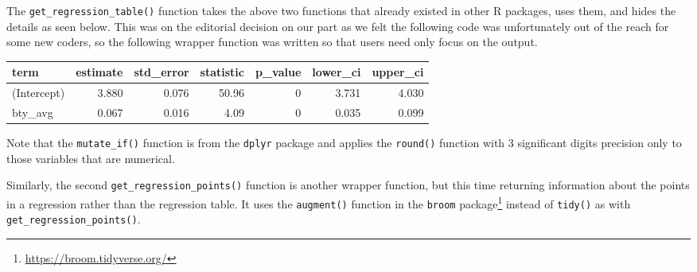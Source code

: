 \documentclass[12pt,]{krantz}
\makeatletter
\newenvironment{Shaded}{\begin{snugshade}}{\end{snugshade}}
\newcommand{\KeywordTok}[1]{\textcolor[rgb]{0.27,0.27,0.27}{\textbf{#1}}}
\newcommand{\DataTypeTok}[1]{\textcolor[rgb]{0.27,0.27,0.27}{#1}}
\newcommand{\DecValTok}[1]{\textcolor[rgb]{0.06,0.06,0.06}{#1}}
\newcommand{\StringTok}[1]{\textcolor[rgb]{0.5,0.5,0.5}{#1}}
\newcommand{\OtherTok}[1]{\textcolor[rgb]{0.37,0.37,0.37}{#1}}
\newcommand{\OperatorTok}[1]{\textcolor[rgb]{0.43,0.43,0.43}{\textbf{#1}}}
\newcommand{\NormalTok}[1]{#1}
\renewcommand{\href}[2]{#2\footnote{\url{#1}}}
\newenvironment{kframe}{%
\medskip{}
\setlength{\fboxsep}{.8em}
 \def\at@end@of@kframe{}%
 \ifinner\ifhmode%
  \def\at@end@of@kframe{\end{minipage}}%
  \begin{minipage}{\columnwidth}%
 \fi\fi%
 \def\FrameCommand##1{\hskip\@totalleftmargin \hskip-\fboxsep
 \colorbox{shadecolor}{##1}\hskip-\fboxsep
     \hskip-\linewidth \hskip-\@totalleftmargin \hskip\columnwidth}%
 \MakeFramed {\advance\hsize-\width
   \@totalleftmargin\z@ \linewidth\hsize
   \@setminipage}}%
 {\par\unskip\endMakeFramed%
 \at@end@of@kframe}
\renewenvironment{Shaded}{\begin{kframe}}{\end{kframe}}
\theoremstyle{definition}
\theoremstyle{definition}
\theoremstyle{definition}
\theoremstyle{remark}
\makeatother
\begin{document}
The \texttt{get\_regression\_table()} function takes the above two
functions that already existed in other R packages, uses them, and hides
the details as seen below. This was on the editorial decision on our
part as we felt the following code was unfortunately out of the reach
for some new coders, so the following wrapper function was written so
that users need only focus on the output.

\begin{Shaded}
\end{Shaded}

\begin{table}[H]
\centering\begingroup\fontsize{10}{12}\selectfont

\begin{tabular}{l|r|r|r|r|r|r}
\hline
term & estimate & std\_error & statistic & p\_value & lower\_ci & upper\_ci\\
\hline
(Intercept) & 3.880 & 0.076 & 50.96 & 0 & 3.731 & 4.030\\
\hline
bty\_avg & 0.067 & 0.016 & 4.09 & 0 & 0.035 & 0.099\\
\hline
\end{tabular}
\endgroup{}
\end{table}

Note that the \texttt{mutate\_if()} function is from the \texttt{dplyr}
package and applies the \texttt{round()} function with 3 significant
digits precision only to those variables that are numerical.

Similarly, the second \texttt{get\_regression\_points()} function is
another wrapper function, but this time returning information about the
points in a regression rather than the regression table. It uses the
\texttt{augment()} function in the
\href{https://broom.tidyverse.org/}{\texttt{broom} package} instead of
\texttt{tidy()} as with \texttt{get\_regression\_points()}.
\end{document}
